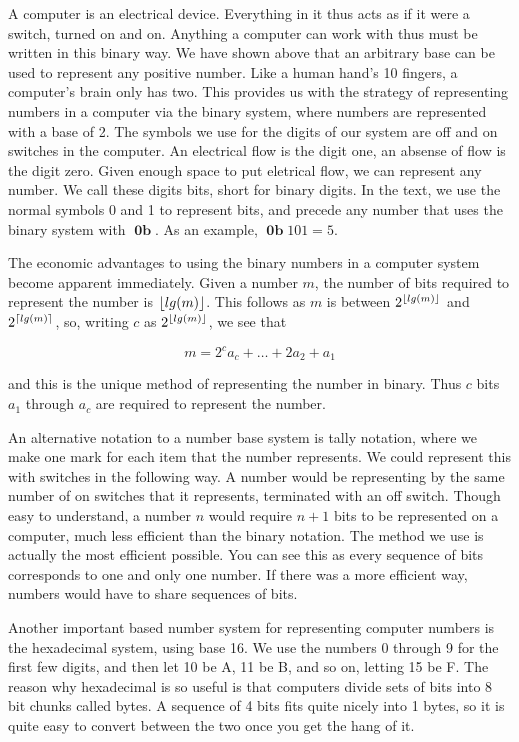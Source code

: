 \documentclass{report}
\DeclareMathOperator{\bin}{\mathbf{0b}}
\DeclarePairedDelimiter{\ceil}{\lceil}{\rceil}
\DeclarePairedDelimiter{\floor}{\lfloor}{\rfloor}
\begin{document}
A computer is an electrical device. Everything in it thus acts as if it were a switch, turned on and on. Anything a computer can work with thus must be written in this binary way. We have shown above that an arbitrary base can be used to represent any positive number. Like a human hand's 10 fingers, a computer's brain only has two. This provides us with the strategy of representing numbers in a computer via the binary system, where numbers are represented with a base of 2. The symbols we use for the digits of our system are off and on switches in the computer. An electrical flow is the digit one, an absense of flow is the digit zero. Given enough space to put eletrical flow, we can represent any number. We call these digits bits, short for binary digits. In the text, we use the normal symbols 0 and 1 to represent bits, and precede any number that uses the binary system with $\bin$. As an example, $\bin101 = 5$.

The economic advantages to using the binary numbers in a computer system become apparent immediately. Given a number $m$, the number of bits required to represent the number is $\floor{lg(m)}$. This follows as $m$ is between $2^{\floor{lg(m)}}$ and $2^{\ceil{lg(m)}}$, so, writing $c$ as $2^{\floor{lg(m)}}$, we see that

\[ m = 2^c a_c + \dots + 2 a_2 + a_1 \]

\noindent and this is the unique method of representing the number in binary. Thus $c$ bits $a_1$ through $a_c$ are required to represent the number.

An alternative notation to a number base system is tally notation, where we make one mark for each item that the number represents. We could represent this with switches in the following way. A number would be representing by the same number of on switches that it represents, terminated with an off switch. Though easy to understand, a number $n$ would require $n+1$ bits to be represented on a computer, much less efficient than the binary notation. The method we use is actually the most efficient possible. You can see this as every sequence of bits corresponds to one and only one number. If there was a more efficient way, numbers would have to share sequences of bits.

Another important based number system for representing computer numbers is the hexadecimal system, using base 16. We use the numbers 0 through 9 for the first few digits, and then let 10 be A, 11 be B, and so on, letting 15 be F. The reason why hexadecimal is so useful is that computers divide sets of bits into 8 bit chunks called bytes. A sequence of 4 bits fits quite nicely into 1 bytes, so it is quite easy to convert between the two once you get the hang of it.
\end{document}
